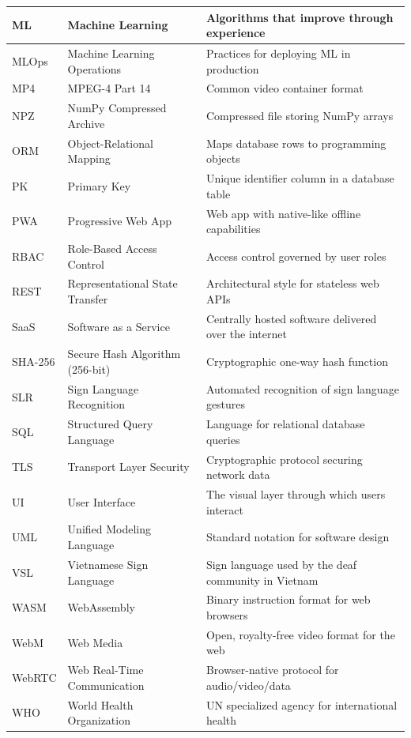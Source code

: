 \begin{longtable}{|p{2.2cm}|p{5.8cm}|p{5.4cm}|}
ML      & Machine Learning & Algorithms that improve through experience \\ \hline
MLOps   & Machine Learning Operations & Practices for deploying ML in production \\ \hline
MP4     & MPEG-4 Part 14 & Common video container format \\ \hline
NPZ     & NumPy Compressed Archive & Compressed file storing NumPy arrays \\ \hline
ORM     & Object-Relational Mapping & Maps database rows to programming objects \\ \hline
PK      & Primary Key & Unique identifier column in a database table \\ \hline
PWA     & Progressive Web App & Web app with native-like offline capabilities \\ \hline
RBAC    & Role-Based Access Control & Access control governed by user roles \\ \hline
REST    & Representational State Transfer & Architectural style for stateless web APIs \\ \hline
SaaS    & Software as a Service & Centrally hosted software delivered over the internet \\ \hline
SHA-256 & Secure Hash Algorithm (256-bit) & Cryptographic one-way hash function \\ \hline
SLR     & Sign Language Recognition & Automated recognition of sign language gestures \\ \hline
SQL     & Structured Query Language & Language for relational database queries \\ \hline
TLS     & Transport Layer Security & Cryptographic protocol securing network data \\ \hline
UI      & User Interface & The visual layer through which users interact \\ \hline
UML     & Unified Modeling Language & Standard notation for software design \\ \hline
VSL     & Vietnamese Sign Language & Sign language used by the deaf community in Vietnam \\ \hline
WASM    & WebAssembly & Binary instruction format for web browsers \\ \hline
WebM    & Web Media & Open, royalty-free video format for the web \\ \hline
WebRTC  & Web Real-Time Communication & Browser-native protocol for audio/video/data \\ \hline
WHO     & World Health Organization & UN specialized agency for international health \\ \hline
\end{longtable}
\normalsize
